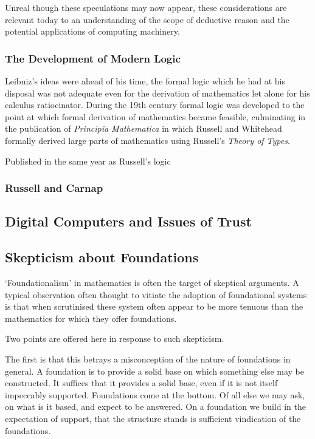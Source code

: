 \documentclass{rbjk}
\begin{document}
\begin{article}
Unreal though these speculations may now appear, these considerations are relevant today to an understanding of the scope of deductive reason and the potential applications of computing machinery.

\subsubsection{The Development of Modern Logic}

Leibniz's ideas were ahead of his time, the formal logic which he had at his disposal was not adequate even for the derivation of mathematics let alone for his calculus ratiocinator.
During the 19th century formal logic was developed to the point at which formal derivation of mathematics became feasible, culminating in the publication of {\it Principia Mathematica} in which Russell and Whitehead formally derived large parts of mathematics using Russell's {\it Theory of Types}.

Published in the same year as Russell's logic \cite{Russell08}

\subsubsection{Russell and Carnap}

\subsection{Digital Computers and Issues of Trust}

\subsection{Skepticism about Foundations}

`Foundationalism' in mathematics is often the target of skeptical arguments.
A typical observation often thought to vitiate the adoption of foundational systems is that when scrutinised these system often appear to be more tenuous than the mathematics for which they offer foundations.

Two points are offered here in response to such skepticism.

The first is that this betrays a misconception of the nature of foundations in general.
A foundation is to provide a solid base on which something else may be constructed.
It suffices that it provides a solid base, even if it is not itself impeccably supported.
Foundations come at the bottom.
Of all else we may ask, on what is it based, and expect to be answered.
On a foundation we build in the expectation of support, that the structure stands is sufficient vindication of the foundations.


\end{article}
\end{document}
